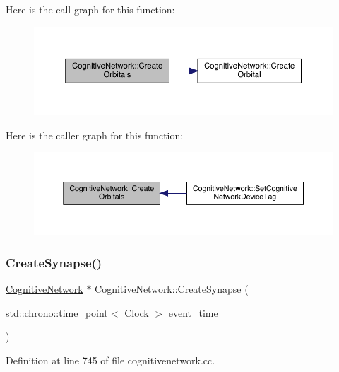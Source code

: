 Here is the call graph for this function\+:
\nopagebreak
\begin{figure}[H]
\begin{center}
\leavevmode
\includegraphics[width=350pt]{class_cognitive_network_a46d4189cf3e6b9af6190abe7b79539b4_cgraph}
\end{center}
\end{figure}
Here is the caller graph for this function\+:
\nopagebreak
\begin{figure}[H]
\begin{center}
\leavevmode
\includegraphics[width=350pt]{class_cognitive_network_a46d4189cf3e6b9af6190abe7b79539b4_icgraph}
\end{center}
\end{figure}
\mbox{\label{class_cognitive_network_ade8e9295b35790b136dca9084a1b7aa9}} 
\subsubsection{\texorpdfstring{Create\+Synapse()}{CreateSynapse()}}
{\footnotesize\ttfamily \hyperlink{class_cognitive_network}{Cognitive\+Network} $\ast$ Cognitive\+Network\+::\+Create\+Synapse (\begin{DoxyParamCaption}\item[{std\+::chrono\+::time\+\_\+point$<$ \hyperlink{universe_8h_a0ef8d951d1ca5ab3cfaf7ab4c7a6fd80}{Clock} $>$}]{event\+\_\+time }\end{DoxyParamCaption})}



Definition at line 745 of file cognitivenetwork.\+cc.

